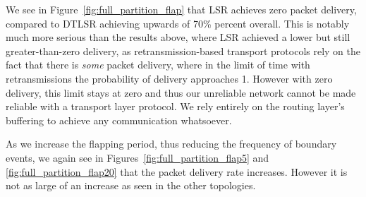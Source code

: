 \documentclass[withindex,glossary,openany]{cam-thesis}
\begin{document}
We see in Figure~\ref{fig:full_partition_flap} that LSR achieves zero packet delivery, compared to DTLSR achieving upwards of 70\% percent overall. This is notably much more serious than the results above, where LSR achieved a lower but still greater-than-zero delivery, as retransmission-based transport protocols rely on the fact that there is \textit{some} packet delivery, where in the limit of time with retransmissions the probability of delivery approaches 1. However with zero delivery, this limit stays at zero and thus our unreliable network cannot be made reliable with a transport layer protocol. We rely entirely on the routing layer's buffering to achieve any communication whatsoever.

As we increase the flapping period, thus reducing the frequency of boundary events, we again see in Figures~\ref{fig:full_partition_flap5} and \ref{fig:full_partition_flap20} that the packet delivery rate increases. However it is not as large of an increase as seen in the other topologies.
\end{document}
